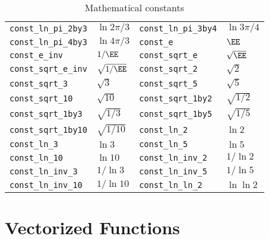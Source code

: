 \begin{table}
\begin{tabularx}{\textwidth}{p{1.5in}Lp{1.5in}L}
    \texttt{const\_ln\_pi\_2by3}   & $\ln{2\pi/3}$   &
    \texttt{const\_ln\_pi\_3by4}   & $\ln{3\pi/4}$   \\
    \texttt{const\_ln\_pi\_4by3}   & $\ln{4\pi/3}$   &
    \texttt{const\_e}              & $\EE$           \\
    \texttt{const\_e\_inv}         & $1/\EE$         &
    \texttt{const\_sqrt\_e}        & $\sqrt{\EE}$    \\
    \texttt{const\_sqrt\_e\_inv}   & $\sqrt{1/\EE}$  &
    \texttt{const\_sqrt\_2}        & $\sqrt{2}$      \\
    \texttt{const\_sqrt\_3}        & $\sqrt{3}$      &
    \texttt{const\_sqrt\_5}        & $\sqrt{5}$      \\
    \texttt{const\_sqrt\_10}       & $\sqrt{10}$     &
    \texttt{const\_sqrt\_1by2}     & $\sqrt{1/2}$    \\
    \texttt{const\_sqrt\_1by3}     & $\sqrt{1/3}$    &
    \texttt{const\_sqrt\_1by5}     & $\sqrt{1/5}$    \\
    \texttt{const\_sqrt\_1by10}    & $\sqrt{1/10}$   &
    \texttt{const\_ln\_2}          & $\ln{2}$        \\
    \texttt{const\_ln\_3}          & $\ln{3}$        &
    \texttt{const\_ln\_5}          & $\ln{5}$        \\
    \texttt{const\_ln\_10}         & $\ln{10}$       &
    \texttt{const\_ln\_inv\_2}     & $1/\ln{2}$      \\
    \texttt{const\_ln\_inv\_3}     & $1/\ln{3}$      &
    \texttt{const\_ln\_inv\_5}     & $1/\ln{5}$      \\
    \texttt{const\_ln\_inv\_10}    & $1/\ln{10}$     &
    \texttt{const\_ln\_ln\_2}      & $\ln\ln{2}$     \\
    \bottomrule
  \end{tabularx}
  \caption{Mathematical constants}
  \label{tab:Mathematical constants}
\end{table}

\clearpage

\section{Vectorized Functions}
\label{sec:Vectorized Functions}

